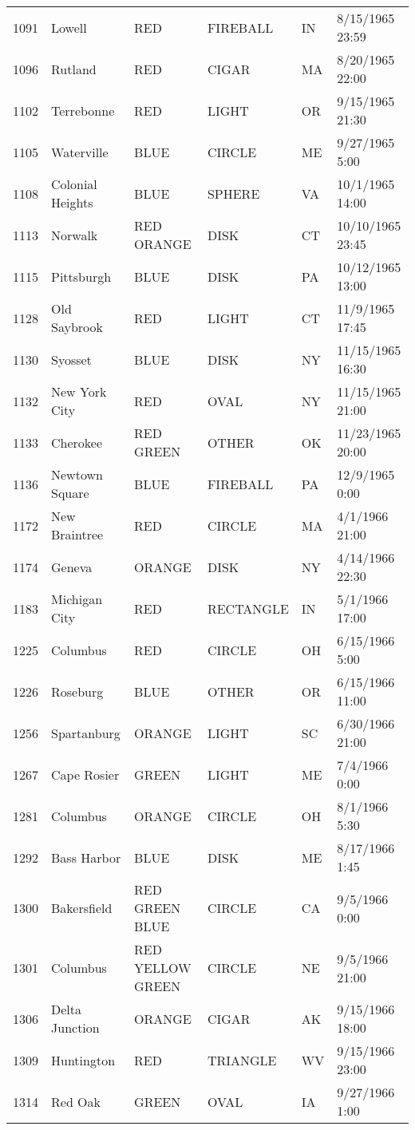 \begin{tabular}{llllll}
1091 & Lowell & RED & FIREBALL & IN & 8/15/1965 23:59 \\
1096 & Rutland & RED & CIGAR & MA & 8/20/1965 22:00 \\
1102 & Terrebonne & RED & LIGHT & OR & 9/15/1965 21:30 \\
1105 & Waterville & BLUE & CIRCLE & ME & 9/27/1965 5:00 \\
1108 & Colonial Heights & BLUE & SPHERE & VA & 10/1/1965 14:00 \\
1113 & Norwalk & RED ORANGE & DISK & CT & 10/10/1965 23:45 \\
1115 & Pittsburgh & BLUE & DISK & PA & 10/12/1965 13:00 \\
1128 & Old Saybrook & RED & LIGHT & CT & 11/9/1965 17:45 \\
1130 & Syosset & BLUE & DISK & NY & 11/15/1965 16:30 \\
1132 & New York City & RED & OVAL & NY & 11/15/1965 21:00 \\
1133 & Cherokee & RED GREEN & OTHER & OK & 11/23/1965 20:00 \\
1136 & Newtown Square & BLUE & FIREBALL & PA & 12/9/1965 0:00 \\
1172 & New Braintree & RED & CIRCLE & MA & 4/1/1966 21:00 \\
1174 & Geneva & ORANGE & DISK & NY & 4/14/1966 22:30 \\
1183 & Michigan City & RED & RECTANGLE & IN & 5/1/1966 17:00 \\
1225 & Columbus & RED & CIRCLE & OH & 6/15/1966 5:00 \\
1226 & Roseburg & BLUE & OTHER & OR & 6/15/1966 11:00 \\
1256 & Spartanburg & ORANGE & LIGHT & SC & 6/30/1966 21:00 \\
1267 & Cape Rosier & GREEN & LIGHT & ME & 7/4/1966 0:00 \\
1281 & Columbus & ORANGE & CIRCLE & OH & 8/1/1966 5:30 \\
1292 & Bass Harbor & BLUE & DISK & ME & 8/17/1966 1:45 \\
1300 & Bakersfield & RED GREEN BLUE & CIRCLE & CA & 9/5/1966 0:00 \\
1301 & Columbus & RED YELLOW GREEN & CIRCLE & NE & 9/5/1966 21:00 \\
1306 & Delta Junction & ORANGE & CIGAR & AK & 9/15/1966 18:00 \\
1309 & Huntington & RED & TRIANGLE & WV & 9/15/1966 23:00 \\
1314 & Red Oak & GREEN & OVAL & IA & 9/27/1966 1:00 \\

\end{tabular}
